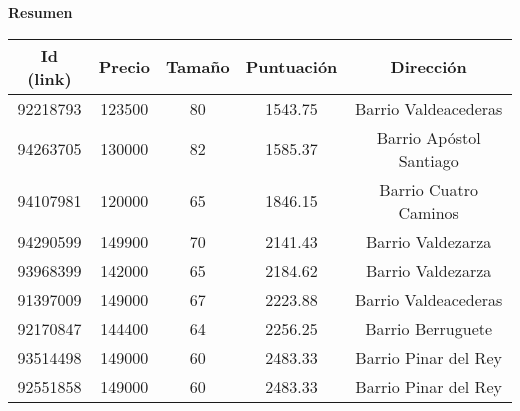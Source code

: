 \documentclass[10pt,a4paper]{report}
\begin{document}
{\LARGE \textbf{Resumen}}

\begin{center}
\begin{tabular}{|c|c|c|c|c|}
\hline
Id (link) & Precio & Tamaño & Puntuación & Dirección \\\hline\hline
92218793 & 123500 & 80 & 1543.75 & Barrio Valdeacederas \\\hline
94263705 & 130000 & 82 & 1585.37 & Barrio Apóstol Santiago \\\hline
94107981 & 120000 & 65 & 1846.15 & Barrio Cuatro Caminos \\\hline
94290599 & 149900 & 70 & 2141.43 & Barrio Valdezarza \\\hline
93968399 & 142000 & 65 & 2184.62 & Barrio Valdezarza \\\hline
91397009 & 149000 & 67 & 2223.88 & Barrio Valdeacederas \\\hline
92170847 & 144400 & 64 & 2256.25 & Barrio Berruguete \\\hline
93514498 & 149000 & 60 & 2483.33 & Barrio Pinar del Rey \\\hline
92551858 & 149000 & 60 & 2483.33 & Barrio Pinar del Rey \\\hline
\end{tabular}
\end{center}
\end{document}
